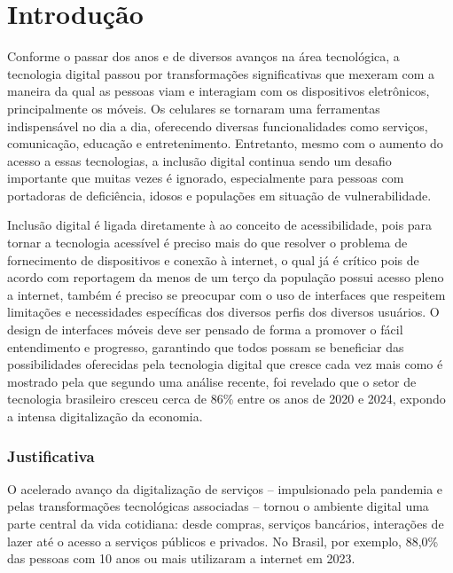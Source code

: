\chapter{Introdução}

Conforme o passar dos anos e de diversos avanços na área tecnológica, a tecnologia digital passou por transformações significativas que mexeram com a maneira da qual as pessoas viam e interagiam com os dispositivos eletrônicos, principalmente os móveis. Os celulares se tornaram uma ferramentas indispensável no dia a dia, oferecendo diversas funcionalidades como serviços, comunicação, educação e entretenimento. Entretanto, mesmo com o aumento do acesso a essas tecnologias, a inclusão digital continua sendo um desafio importante que muitas vezes é ignorado, especialmente para pessoas com portadoras de deficiência, idosos e populações em situação de vulnerabilidade.

Inclusão digital é ligada diretamente à ao conceito de acessibilidade, pois para tornar a tecnologia acessível é preciso mais do que resolver o problema de fornecimento de dispositivos e conexão à internet, o qual já é crítico pois de acordo com reportagem da \cite{g1_acesso_pleno_internet_2022} menos de um terço da população possui acesso pleno a internet, também é preciso se preocupar com o uso de interfaces que respeitem limitações e necessidades específicas dos diversos perfis dos diversos usuários. O design de interfaces móveis deve ser pensado de forma a promover o fácil entendimento e progresso, garantindo que todos possam se beneficiar das possibilidades oferecidas pela tecnologia digital que cresce cada vez mais como é mostrado pela \cite{veja_pais_se_digitaliza_2024} que segundo uma análise recente, foi revelado que o setor de tecnologia brasileiro cresceu cerca de 86\% entre os anos de 2020 e 2024, expondo a intensa digitalização da economia.

\subsection*{Justificativa}

O acelerado avanço da digitalização de serviços -- impulsionado pela pandemia e pelas transformações tecnológicas associadas -- tornou o ambiente digital uma parte central da vida cotidiana: desde compras, serviços bancários, interações de lazer até o acesso a serviços públicos e privados. No Brasil, por exemplo, 88,0\% das pessoas com 10 anos ou mais utilizaram a internet em 2023.

